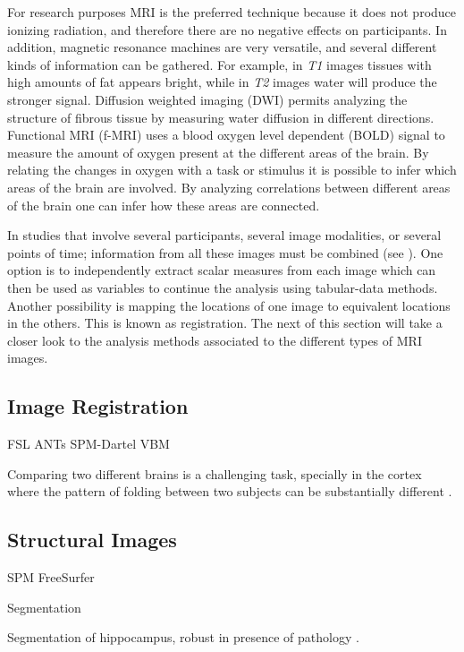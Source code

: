 For research purposes MRI is the preferred technique because it does not produce ionizing radiation, and therefore there are no negative effects on participants. In addition, magnetic resonance machines are very versatile, and several different kinds of information can be gathered. For example, in \emph{T1} images tissues with high amounts of fat appears bright, while in \emph{T2} images water will produce the stronger signal. Diffusion weighted imaging (DWI) permits analyzing the structure of fibrous tissue by measuring water diffusion in different directions. Functional MRI (f-MRI) uses a blood oxygen level dependent (BOLD) signal to measure the amount of oxygen present at the different areas of the brain. By relating the changes in oxygen with a task or stimulus it is possible to infer which areas of the brain are involved. By analyzing correlations between different areas of the brain one can infer how these areas are connected.

In studies that involve several participants, several image modalities, or several points of time; information from all these images must be combined (see \autocite{botha_individual_2012}). One option is to independently extract scalar measures from each image which can then be used as variables to continue the analysis using tabular-data methods. Another possibility is mapping the locations of one image to equivalent locations in the others. This is known as registration. The next of this section will take a closer look to the analysis methods associated to the different types of MRI images.
 

\subsection{Image Registration}

FSL
ANTs
SPM-Dartel
VBM

Comparing two different brains is a challenging task, specially in the cortex where the pattern of folding between two subjects can be substantially different \autocite{toga_new_2002}.

\subsection{Structural Images}

SPM
FreeSurfer

Segmentation

Segmentation of hippocampus, robust in presence of pathology \autocite{kim_robust_2011}.

